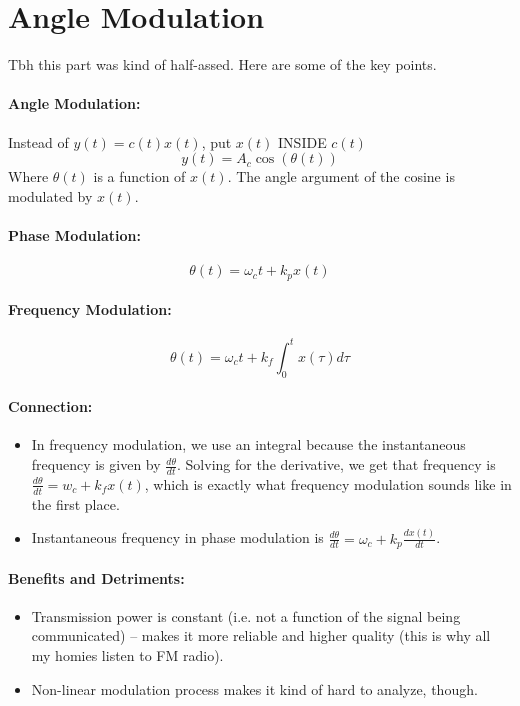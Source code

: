 \documentclass[a4paper,12pt]{report}
\begin{document}
\section{Angle Modulation}

Tbh this part was kind of half-assed. Here are some of the key points.

\paragraph{Angle Modulation: } Instead of $y(t) = c(t) x(t)$, put $x(t)$ INSIDE $c(t)$ 
\begin{equation}
y(t) = A_c \cos(\theta(t))
\end{equation}
Where $\theta(t)$ is a function of $x(t)$. The angle argument of the cosine is modulated by $x(t)$.

\paragraph{Phase Modulation: } 
\begin{equation}
\theta(t) = \omega_c t + k_p x(t)
\end{equation}

\paragraph{Frequency Modulation: } 
\begin{equation}
\theta(t) = \omega_c t + k_f \int_{0}^{t} x(\tau) d\tau
\end{equation}

\paragraph{Connection: }
\begin{itemize}
\item In frequency modulation, we use an integral because the instantaneous frequency is given by $\frac{d\theta}{dt}$. Solving for the derivative, we get that frequency is $\frac{d\theta}{d t} = w_c + k_f x(t)$, which is exactly what frequency modulation sounds like in the first place.
\item Instantaneous frequency in phase modulation is $\frac{d \theta}{dt} = \omega_c + k_p \frac{dx(t)}{dt}$.
\end{itemize}

\paragraph{Benefits and Detriments: } 
\begin{itemize}
\item Transmission power is constant (i.e. not a function of the signal being communicated) -- makes it more reliable and higher quality (this is why all my homies listen to FM radio).
\item Non-linear modulation process makes it kind of hard to analyze, though.
\end{itemize}
\end{document}

